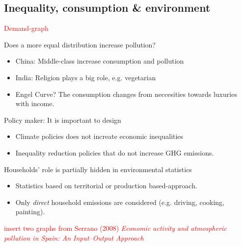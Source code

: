 \subsection{Inequality, consumption \& environment}
\textcolor{red}{Demand-graph}
\begin{multicols}{2}
Does a more equal distribution increase pollution?
\begin{itemize}
  \item China: Middle-class increase consumption and pollution
  \item India: Religion plays a big role, e.g. vegetarian
  \item Engel Curve? The consumption changes from neccesities towards luxuries with income.
\end{itemize}
Policy maker: It is important to design
\begin{itemize}
  \item Climate policies does not increate economic inequalities
  \item Inequality reduction policies that do not increase GHG emissions.
\end{itemize}
Households' role is partially hidden in environmental statistics
\begin{itemize}
  \item Statistics based on territorial or production based-approach.
  \item Only \textit{direct} household emissions are considered (e.g. driving, cooking, painting).
\end{itemize}
\textcolor{red}{insert two graphs from Serrano (2008) \textit{Economic activity and atmospheric pollution in Spain: An Input–Output Approach}}\\


\end{multicols}
